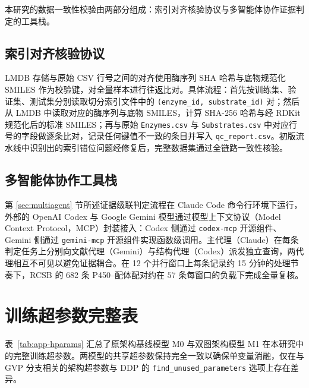 本研究的数据一致性校验由两部分组成：索引对齐核验协议与多智能体协作证据判定的工具栈。

\subsection{索引对齐核验协议}
\label{subsec:qc-index}

LMDB 存储与原始 CSV 行号之间的对齐使用酶序列 SHA 哈希与底物规范化 SMILES 作为校验键，对全量样本进行往返比对。具体流程：首先按训练集、验证集、测试集分别读取切分索引文件中的 \texttt{(enzyme\_id, substrate\_id)} 对；然后从 LMDB 中读取对应的酶序列与底物 SMILES，计算 SHA-256 哈希与经 RDKit 规范化后的标准 SMILES；再与原始 \texttt{Enzymes.csv} 与 \texttt{Substrates.csv} 中对应行号的字段做逐条比对，记录任何键值不一致的条目并写入 \texttt{qc\_report.csv}。初版流水线中识别出的索引错位问题经修复后，完整数据集通过全链路一致性核验。

\subsection{多智能体协作工具栈}
\label{subsec:qc-multiagent}

第 \ref{sec:multiagent} 节所述证据级联判定流程在 Claude Code 命令行环境下运行，外部的 OpenAI Codex 与 Google Gemini 模型通过模型上下文协议（Model Context Protocol，MCP）封装接入：Codex 侧通过 \texttt{codex-mcp} 开源组件、Gemini 侧通过 \texttt{gemini-mcp} 开源组件实现函数级调用。主代理（Claude）在每条判定任务上分别向文献代理（Gemini）与结构代理（Codex）派发独立查询，两代理相互不可见以避免证据耦合。在 12 个并行窗口上每条记录约 15 分钟的处理节奏下，RCSB 的 682 条 P450--配体配对约在 $57$ 条每窗口的负载下完成全量复核。

\section{训练超参数完整表}
\label{app:hyperparameters}

表~\ref{tab:app-hparams} 汇总了原架构基线模型 M0 与双图架构模型 M1 在本研究中的完整训练超参数。两模型的共享超参数保持完全一致以确保单变量消融，仅在与 GVP 分支相关的架构超参数与 DDP 的 \texttt{find\_unused\_parameters} 选项上存在差异。

